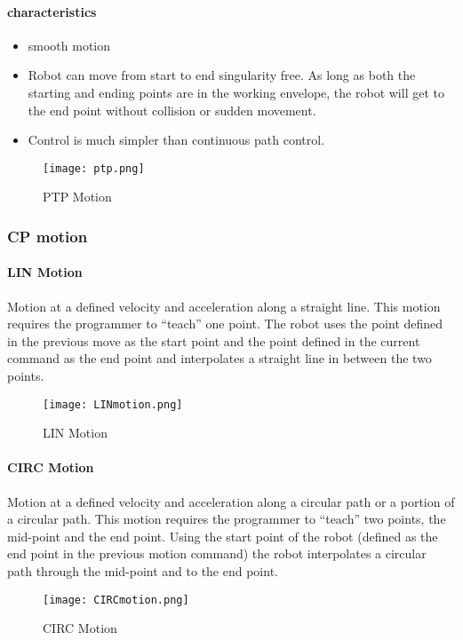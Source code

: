 \documentclass[a4paper]{report}
\begin{document}
	   \paragraph{characteristics}
	   
	  
	   \begin{itemize}
	   	\item smooth motion
	   	\item Robot can move from start to end singularity free. As long as both the starting and ending points are in the working envelope, the robot will get to the end point without collision or sudden movement. 
	   	\item	Control is much simpler than continuous path control. 
	   \end{itemize}
   \begin{figure}[h]
   	\caption{PTP Motion}
   	\centering
   	\texttt{[image: ptp.png]}
   \end{figure} 
	   
 \subsubsection{CP motion}
 \paragraph{LIN Motion}
 Motion at a defined velocity and acceleration along a straight line.  This motion requires the programmer to “teach” one point.  The robot uses the point defined in the previous move as the start point and the point defined in the current command as the end point and interpolates a straight line in between the two points.
 
 \begin{figure}[h]
 	\caption{LIN Motion}
 	\centering
 	\texttt{[image: LINmotion.png]}
 \end{figure}
\paragraph{CIRC Motion}
Motion at a defined velocity and acceleration along a circular path or a portion of a circular path.  This motion requires the programmer to “teach” two points, the mid-point and the end point.  Using the start point of the robot (defined as the end point in the previous motion command) the robot interpolates a circular path through the mid-point and to the end point.
\begin{figure}[h]
	\centering
	\caption{CIRC Motion}
	\texttt{[image: CIRCmotion.png]}
\end{figure} 
\end{document}
